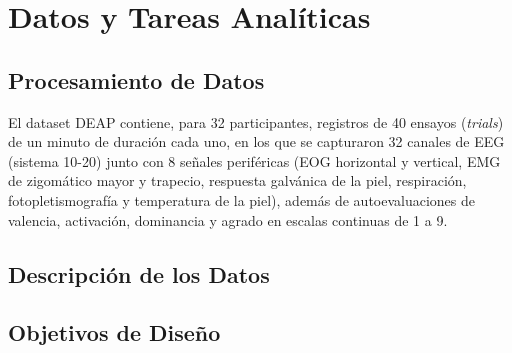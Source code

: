\section{Datos y Tareas Analíticas}\label{sec:data-tasks}

\subsection{Procesamiento de Datos}\label{sec:data-processing}

El dataset DEAP \cite{koelstra2012deap} contiene, para 32 participantes, registros de 40 ensayos (\emph{trials}) de un minuto de duración cada uno, en los que se capturaron 32 canales de EEG (sistema 10-20) junto con 8 señales periféricas (EOG horizontal y vertical, EMG de zigomático mayor y trapecio, respuesta galvánica de la piel, respiración, fotopletismografía y temperatura de la piel), además de autoevaluaciones de valencia, activación, dominancia y agrado en escalas continuas de 1 a 9.


\subsection{Descripción de los Datos}\label{sec:data-description}



\subsection{Objetivos de Diseño}\label{sec:design-goals}

